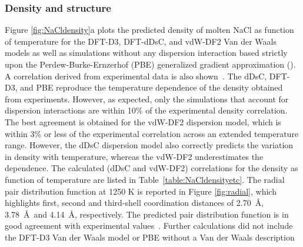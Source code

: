 \documentclass[preprint,3p,10pt,onecolumn,number,sort&compress]{elsarticle}
\begin{document}
\subsubsection{Density and structure}
Figure \ref{fig:NaCldensity}a plots the predicted density of molten NaCl as function of temperature for the DFT-D3, DFT-dDsC, and vdW-DF2 Van der Waals models as well as simulations without any dispersion interaction based strictly upon the Perdew-Burke-Ernzerhof (PBE) generalized gradient approximation (\cite{pbe}). A correlation derived from experimental data is also shown~\cite{Janz1988}. The dDsC, DFT-D3, and PBE reproduce the temperature dependence of the density obtained from experiments. However, as expected, only the simulations that account for dispersion interactions are within 10\% of the experimental density correlation. The best agreement is obtained for the vdW-DF2 dispersion model, which is within 3\% or less of the experimental correlation across an extended temperature range. However, the dDsC dispersion model also correctly predicts the variation in density with temperature, whereas the vdW-DF2 underestimates the dependence. The calculated (dDsC and vdW-DF2) correlations for the density as function of temperature are listed in Table~\ref{table:NaCldensityetc}. The radial pair distribution function at 1250 K is reported in Figure \ref{fig:radial}, which highlights first, second and third-shell coordination distances of 2.70~\AA, 3.78~\AA~and 4.14~\AA, respectively. The predicted pair distribution function is in good agreement with experimental values~\cite{Edwards_1975}. Further calculations did not include the DFT-D3 Van der Waals model or PBE without a Van der Waals description

\end{document}
